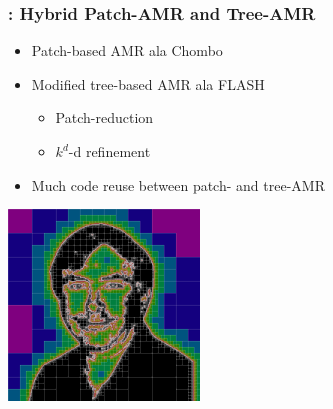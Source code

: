 \begin{frame}[fragile] \frametitle{\cello: Hybrid Patch-AMR and Tree-AMR}

\begin{minipage}{2in}
\begin{itemize}
\item Patch-based AMR ala Chombo
\item Modified tree-based AMR ala FLASH
\begin{itemize}
\item Patch-reduction
\item $k^d$-d refinement
\end{itemize}
\item Much code reuse between patch- and tree-AMR
\end{itemize}
\end{minipage}
\begin{minipage}{2.0in}
\centerline{\includegraphics[width=2.0in]{norman.png}}
\end{minipage}
\end{frame}
